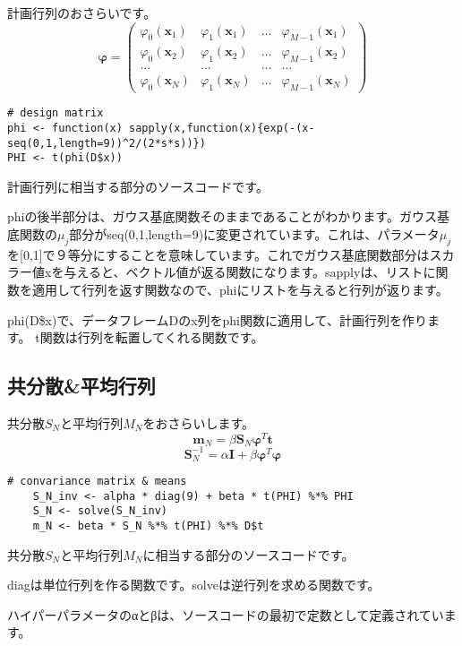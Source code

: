 \documentclass[uplatex]{jsarticle}
\begin{document}
計画行列のおさらいです。
\begin{equation}
\mathbf{φ}=\left(
\begin{array}{cccc}
φ_0(\mathbf{x}_1) & φ_1(\mathbf{x}_1) & … & φ_{M-1}(\mathbf{x}_1)\\
φ_0(\mathbf{x}_2) & φ_1(\mathbf{x}_2) & … & φ_{M-1}(\mathbf{x}_2)\\
… & … & … & …\\
φ_0(\mathbf{x}_N) & φ_1(\mathbf{x}_N) & … & φ_{M-1}(\mathbf{x}_N) 
\end{array}
\right)
\end{equation}

\begin{lstlisting}[basicstyle=\ttfamily\footnotesize, frame=single]
# design matrix
phi <- function(x) sapply(x,function(x){exp(-(x-seq(0,1,length=9))^2/(2*s*s))})
PHI <- t(phi(D$x))
\end{lstlisting}

計画行列に相当する部分のソースコードです。\par
phiの後半部分は、ガウス基底関数そのままであることがわかります。ガウス基底関数の$μ_j$部分がseq(0,1,length=9)に変更されています。これは、パラメータ$μ_j$を[0,1]で９等分にすることを意味しています。これでガウス基底関数部分はスカラー値xを与えると、ベクトル値が返る関数になります。sapplyは、リストに関数を適用して行列を返す関数なので、phiにリストを与えると行列が返ります。\par
phi(D\$x)で、データフレームDのx列をphi関数に適用して、計画行列を作ります。
t関数は行列を転置してくれる関数です。

\subsection{共分散\&平均行列}
共分散$S_N$と平均行列$M_N$をおさらいします。
\begin{equation}
\mathbf{m}_N=β\mathbf{S}_N\mathbf{φ}^T\mathbf{t}
\end{equation}
\begin{equation}
\mathbf{S}^{-1}_N=α\mathbf{I}+β\mathbf{φ}^T\mathbf{φ}
\end{equation}
\begin{lstlisting}[basicstyle=\ttfamily\footnotesize, frame=single]
    # convariance matrix & means
    S_N_inv <- alpha * diag(9) + beta * t(PHI) %*% PHI
    S_N <- solve(S_N_inv)
    m_N <- beta * S_N %*% t(PHI) %*% D$t
\end{lstlisting}

共分散$S_N$と平均行列$M_N$に相当する部分のソースコードです。\par
diagは単位行列を作る関数です。solveは逆行列を求める関数です。\par
ハイパーパラメータのαとβは、ソースコードの最初で定数として定義されています。
\end{document}
